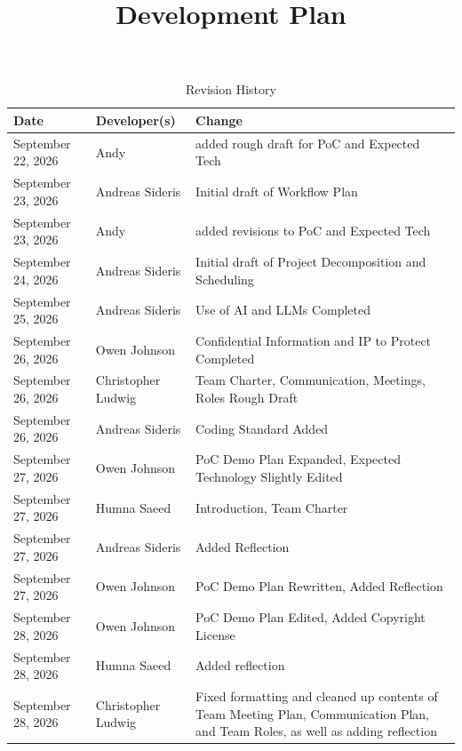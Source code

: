\documentclass{article}
\title{Development Plan\\\progname}
\author{\authname}
\date{}
\begin{document}
\maketitle

\begin{table}[hp]
\caption{Revision History} \label{TblRevisionHistory}
\begin{tabularx}{\textwidth}{llX}
\toprule
\textbf{Date} & \textbf{Developer(s)} & \textbf{Change}\\
\midrule
September 22, 2026 & Andy & added rough draft for PoC and Expected Tech \\
September 23, 2026 & Andreas Sideris & Initial draft of Workflow 
Plan\\
September 23, 2026 & Andy & added revisions to PoC and Expected Tech \\
September 24, 2026 & Andreas Sideris & Initial draft of Project 
Decomposition and Scheduling\\
September 25, 2026 & Andreas Sideris & Use of AI and LLMs Completed\\
September 26, 2026 & Owen Johnson & Confidential Information and IP to Protect 
Completed\\
September 26, 2026 & Christopher Ludwig & Team Charter, Communication, 
Meetings, Roles Rough Draft\\
September 26, 2026 & Andreas Sideris & Coding Standard Added\\
September 27, 2026 & Owen Johnson & PoC Demo Plan Expanded, Expected 
Technology Slightly Edited\\
September 27, 2026 & Humna Saeed & Introduction, Team Charter\\ 
September 27, 2026 & Andreas Sideris & Added Reflection\\ 
September 27, 2026 & Owen Johnson & PoC Demo Plan Rewritten, Added 
Reflection\\
September 28, 2026 & Owen Johnson & PoC Demo Plan Edited, Added 
Copyright License\\
September 28, 2026 & Humna Saeed & Added reflection \\
September 28, 2026 & Christopher Ludwig & Fixed formatting and cleaned up contents 
of Team Meeting Plan, Communication Plan, and Team Roles, as well as adding reflection\\
\bottomrule
\end{tabularx}
\end{table}

\newpage{}
\end{document}
